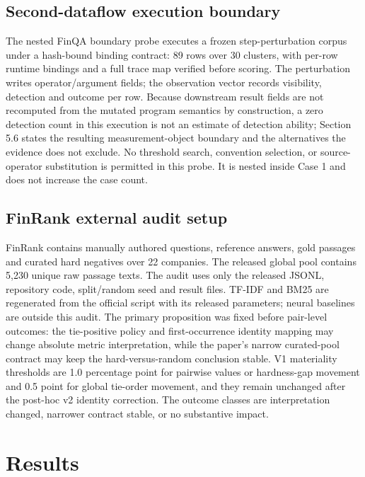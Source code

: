 \documentclass[10pt]{article}
\begin{document}
\subsection{Second-dataflow execution boundary}
The nested FinQA boundary probe executes a frozen step-perturbation corpus under a hash-bound binding contract: 89 rows over 30 clusters, with per-row runtime bindings and a full trace map verified before scoring. The perturbation writes operator/argument fields; the observation vector records visibility, detection and outcome per row. Because downstream result fields are not recomputed from the mutated program semantics by construction, a zero detection count in this execution is not an estimate of detection ability; Section 5.6 states the resulting measurement-object boundary and the alternatives the evidence does not exclude. No threshold search, convention selection, or source-operator substitution is permitted in this probe. It is nested inside Case 1 and does not increase the case count.
\subsection{FinRank external audit setup}
FinRank contains manually authored questions, reference answers, gold passages and curated hard negatives over 22 companies. The released global pool contains 5,230 unique raw passage texts. The audit uses only the released JSONL, repository code, split/random seed and result files. TF-IDF and BM25 are regenerated from the official script with its released parameters; neural baselines are outside this audit.
The primary proposition was fixed before pair-level outcomes: the tie-positive policy and first-occurrence identity mapping may change absolute metric interpretation, while the paper's narrow curated-pool contract may keep the hard-versus-random conclusion stable. V1 materiality thresholds are 1.0 percentage point for pairwise values or hardness-gap movement and 0.5 point for global tie-order movement, and they remain unchanged after the post-hoc v2 identity correction. The outcome classes are interpretation changed, narrower contract stable, or no substantive impact.
\section{Results}
\end{document}
